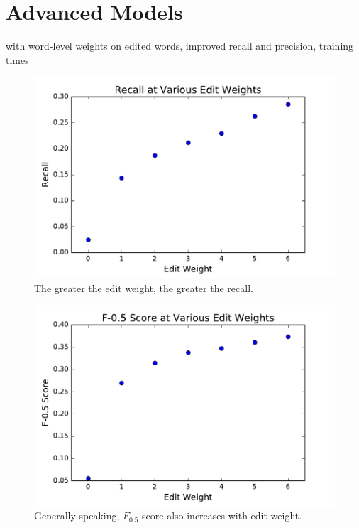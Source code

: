 \section{Advanced Models}
with word-level weights on edited words, improved recall and precision, training times

\begin{figure}[h]
\centering
\includegraphics[]{edit_weight_recall}
\caption{The greater the edit weight, the greater the recall.}
\label{fig:edit-weight-recall}
\end{figure}

\begin{figure}[h]
\centering
\includegraphics[]{edit_weight_F-0_5}
\caption{Generally speaking, $F_{0.5}$ score also increases with edit weight.}
\label{fig:edit-weight-m2}
\end{figure}